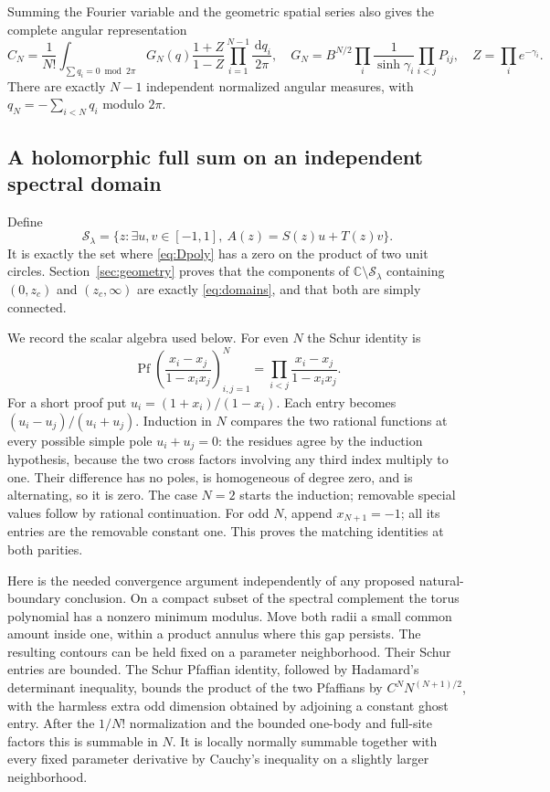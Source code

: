 \documentclass[11pt]{article}
\numberwithin{equation}{section}
\theoremstyle{definition}
\newcommand{\C}{\mathbb C}
\newcommand{\dd}{\,\mathrm d}
\newcommand{\cS}{\mathcal S}
\begin{document}
Summing the Fourier variable and the geometric spatial series also gives
the complete angular representation
\begin{equation}\label{eq:fullangular}
 C_N=\frac1{N!}\int_{\sum q_i=0\bmod2\pi}
 G_N(q)\frac{1+Z}{1-Z}\prod_{i=1}^{N-1}\frac{\dd q_i}{2\pi},\quad
 G_N=B^{N/2}\prod_i\frac1{\sinh\gamma_i}\prod_{i<j}P_{ij},\quad
 Z=\prod_i e^{-\gamma_i}.
\end{equation}
There are exactly $N-1$ independent normalized angular measures, with
$q_N=-\sum_{i<N}q_i$ modulo $2\pi$.

\subsection{A holomorphic full sum on an independent spectral domain}
Define
\begin{equation}\label{eq:physicalspectralset}
 \cS_\lambda=\{z:\exists u,v\in[-1,1],\ A(z)=S(z)u+T(z)v\}.
\end{equation}
It is exactly the set where \eqref{eq:Dpoly} has a zero on the product
of two unit circles. Section~\ref{sec:geometry} proves that the components
of $\C\setminus\cS_\lambda$ containing $(0,z_c)$ and $(z_c,\infty)$
are exactly \eqref{eq:domains}, and that both are simply connected.

We record the scalar algebra used below.  For even $N$ the Schur
identity is
\[
 \operatorname{Pf}\left(\frac{x_i-x_j}{1-x_ix_j}\right)_{i,j=1}^N
       =\prod_{i<j}\frac{x_i-x_j}{1-x_ix_j}.
\]
For a short proof put $u_i=(1+x_i)/(1-x_i)$.  Each entry becomes
$(u_i-u_j)/(u_i+u_j)$.  Induction in $N$ compares the two rational
functions at every possible simple pole $u_i+u_j=0$: the residues
agree by the induction hypothesis, because the two cross factors
involving any third index multiply to one.  Their difference has no
poles, is homogeneous of degree zero, and is alternating, so it is
zero.  The case $N=2$ starts the induction; removable special values
follow by rational continuation.  For odd $N$, append $x_{N+1}=-1$;
all its entries are the removable constant one.  This proves the
matching identities at both parities.

Here is the needed convergence argument independently of any proposed
natural-boundary conclusion. On a compact subset of the spectral
complement the torus polynomial has a nonzero minimum modulus. Move
both radii a small common amount inside one, within a product annulus
where this gap persists. The resulting contours can be held fixed on
a parameter neighborhood. Their Schur entries are bounded. The Schur
Pfaffian identity, followed by Hadamard's determinant inequality, bounds
the product of the two Pfaffians by
$C^N N^{(N+1)/2}$, with the harmless extra odd dimension obtained by
adjoining a constant ghost entry. After the $1/N!$ normalization and
the bounded one-body and full-site factors this is summable in $N$.
It is locally normally summable together with every fixed parameter
derivative by Cauchy's inequality on a slightly larger neighborhood.
\end{document}
